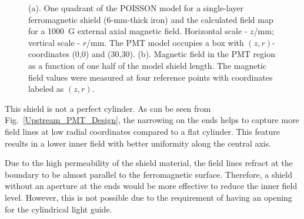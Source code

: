 \documentclass[12pt]{article}
\begin{document}
\begin{figure}[htbp]
\centering
{}
\qquad
{}
\caption{(a). One quadrant of the POISSON model for a single-layer ferromagnetic 
shield (6-mm-thick iron) and the calculated field map for a 1000~G external axial 
magnetic field. Horizontal scale - $z$/mm; vertical scale - $r$/mm. The PMT model  
occupies a box with $(z,r)$-coordinates (0,0) and (30,30). (b). Magnetic field in 
the PMT region as a function of one half of the model shield length. The magnetic 
field values were measured at four reference points with coordinates labeled as 
$(z,r)$.}
\label{fig:SH8500}
\end{figure}

This shield is not a  perfect cylinder. As can be seen from 
Fig.~\ref{Upstream_PMT_Design}, the narrowing on the ends helps to capture more
field lines at low radial coordinates compared to a flat cylinder. This feature 
results in a lower inner field with better uniformity along the central axis.

Due to the high permeability of the shield material, the field lines refract at the 
boundary to be almost parallel to the ferromagnetic surface. Therefore, a shield 
without an aperture at the ends would be more effective to reduce the inner field 
level. However, this is not possible due to the requirement of having an opening 
for the cylindrical light guide.
\end{document}
